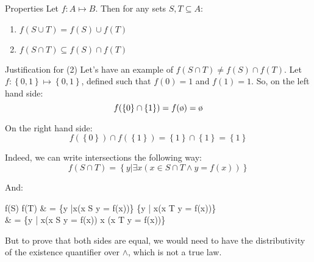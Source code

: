 \documentclass[a4paper]{article}
\begin{document}
\begin{parag}{Properties}
    Let $f: A \mapsto B$. Then for any sets $S, T \subseteq A$:
    \begin{enumerate}
        \item $f\left(S \cup T\right) = f\left(S\right) \cup f\left(T\right)$
        \item $f\left(S \cap T\right) \subseteq f\left(S\right) \cap f\left(T\right)$
    \end{enumerate}
    
    \begin{subparag}{Justification for (2)}
        Let's have an example of $f\left(S \cap T\right) \neq f\left(S\right) \cap f\left(T\right)$. Let $f: \left\{0, 1\right\}\mapsto \left\{0, 1\right\}$, defined such that $f\left(0\right) = 1$ and $f\left(1\right) = 1$. So, on the left hand side: 
        \[f\left(\left\{0\right\} \cap \left\{1\right\}\right) = f\left(\o\right) = \o\]

        On the right hand side: 
        \[f\left(\left\{0\right\}\right) \cap f\left(\left\{1\right\}\right) = \left\{1\right\} \cap \left\{1\right\} = \left\{1\right\}\]
        
        Indeed, we can write intersections the following way: 
        \[f\left(S \cap T\right) = \left\{y | \exists x\left(x \in S \cap T \land y = f\left(x\right)\right)\right\}\]

        And: 
        \begin{multiequality}
            f\left(S\right) \cap f\left(T\right) & = \left\{y |\exists x\left(x \in S \land y = f\left(x\right)\right)\right\} \cap \left\{y | \exists x\left(x \in T \land y = f\left(x\right)\right)\right\}  \\
            & = \left\{y | \exists x\left(x \in S \land y = f\left(x\right)\right) \land \exists x \left(x \in T \land y = f\left(x\right)\right)\right\}
        \end{multiequality}

        
        But to prove that both sides are equal, we would need to have the distributivity of the existence quantifier over $\land$, which is not a true law.
    \end{subparag}
\end{parag}
\end{document}
